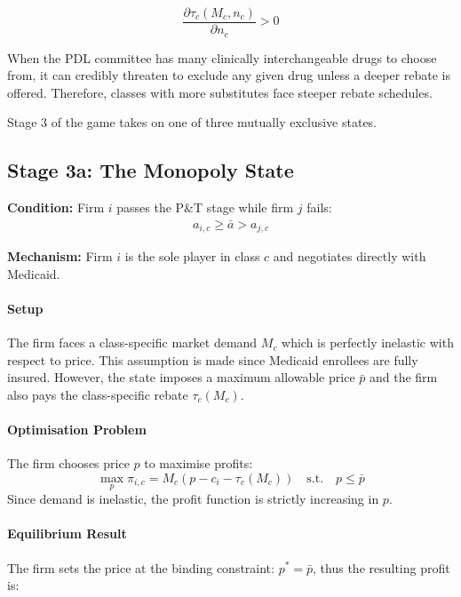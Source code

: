 \documentclass[12pt]{article}
\begin{document}
\begin{equation} \label{eq:tau_steepness}
\frac{\partial \tau_c(M_c, n_c)}{\partial n_c} > 0
\end{equation}

When the PDL committee has many clinically interchangeable drugs to choose from, it can credibly threaten to exclude any given drug unless a deeper rebate is offered. Therefore, classes with more substitutes face steeper rebate schedules.

Stage 3 of the game takes on one of three mutually exclusive states.

\subsection{Stage 3a: The Monopoly State}

\textbf{Condition:} Firm $i$ passes the P\&T stage while firm $j$ fails:
\begin{align*}
    a_{i,c} \geq \bar{a} > a_{j,c}
\end{align*}

\textbf{Mechanism:} Firm $i$ is the sole player in class $c$ and negotiates directly with Medicaid.

\paragraph{Setup} 
The firm faces a class-specific market demand $M_c$ which is perfectly inelastic with respect to price. This assumption is made since Medicaid enrollees are fully insured. However, the state imposes a maximum allowable price $\bar{p}$ and the firm also pays the class-specific rebate $\tau_c(M_c)$.

\paragraph{Optimisation Problem}
The firm chooses price $p$ to maximise profits:
\begin{equation}
    \max_{p} \pi_{i,c} = M_c(p - c_i - \tau_c(M_c)) \quad \text{s.t.} \quad p \le \bar{p}
\end{equation}
Since demand is inelastic, the profit function is strictly increasing in $p$.

\paragraph{Equilibrium Result}
The firm sets the price at the binding constraint: $p^* = \bar{p}$, thus the resulting profit is:
\end{document}
